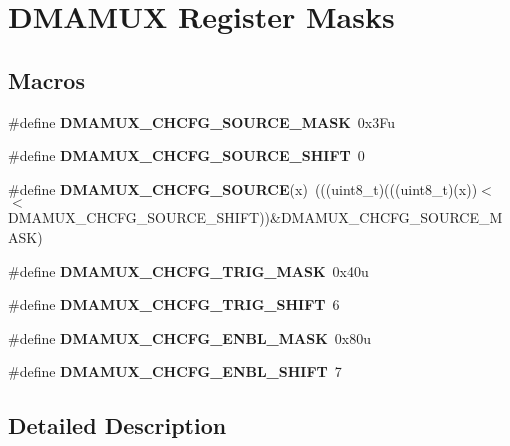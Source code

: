 \hypertarget{group___d_m_a_m_u_x___register___masks}{}\section{D\+M\+A\+M\+UX Register Masks}
\label{group___d_m_a_m_u_x___register___masks}
\subsection*{Macros}
\begin{DoxyCompactItemize}
\item 
\mbox{\label{group___d_m_a_m_u_x___register___masks_ga35b279ba0b1c9e817901494cdac305c5}} 
\#define {\bfseries D\+M\+A\+M\+U\+X\+\_\+\+C\+H\+C\+F\+G\+\_\+\+S\+O\+U\+R\+C\+E\+\_\+\+M\+A\+SK}~0x3\+Fu
\item 
\mbox{\label{group___d_m_a_m_u_x___register___masks_gac2b7553c4599d8e919750598dd03f8a3}} 
\#define {\bfseries D\+M\+A\+M\+U\+X\+\_\+\+C\+H\+C\+F\+G\+\_\+\+S\+O\+U\+R\+C\+E\+\_\+\+S\+H\+I\+FT}~0
\item 
\mbox{\label{group___d_m_a_m_u_x___register___masks_ga26ed125b670223f11ea326335729bb9b}} 
\#define {\bfseries D\+M\+A\+M\+U\+X\+\_\+\+C\+H\+C\+F\+G\+\_\+\+S\+O\+U\+R\+CE}(x)~(((uint8\+\_\+t)(((uint8\+\_\+t)(x))$<$$<$D\+M\+A\+M\+U\+X\+\_\+\+C\+H\+C\+F\+G\+\_\+\+S\+O\+U\+R\+C\+E\+\_\+\+S\+H\+I\+FT))\&D\+M\+A\+M\+U\+X\+\_\+\+C\+H\+C\+F\+G\+\_\+\+S\+O\+U\+R\+C\+E\+\_\+\+M\+A\+SK)
\item 
\mbox{\label{group___d_m_a_m_u_x___register___masks_gafd2b6158f86bedffb640e73c40cdd0f5}} 
\#define {\bfseries D\+M\+A\+M\+U\+X\+\_\+\+C\+H\+C\+F\+G\+\_\+\+T\+R\+I\+G\+\_\+\+M\+A\+SK}~0x40u
\item 
\mbox{\label{group___d_m_a_m_u_x___register___masks_ga714a6b142fde49d701e3f624bb2417e1}} 
\#define {\bfseries D\+M\+A\+M\+U\+X\+\_\+\+C\+H\+C\+F\+G\+\_\+\+T\+R\+I\+G\+\_\+\+S\+H\+I\+FT}~6
\item 
\mbox{\label{group___d_m_a_m_u_x___register___masks_ga311ccb0a9a00f29da44f8c41b33ba79f}} 
\#define {\bfseries D\+M\+A\+M\+U\+X\+\_\+\+C\+H\+C\+F\+G\+\_\+\+E\+N\+B\+L\+\_\+\+M\+A\+SK}~0x80u
\item 
\mbox{\label{group___d_m_a_m_u_x___register___masks_ga23d6f41370761b5c68e4d49f419aaee9}} 
\#define {\bfseries D\+M\+A\+M\+U\+X\+\_\+\+C\+H\+C\+F\+G\+\_\+\+E\+N\+B\+L\+\_\+\+S\+H\+I\+FT}~7
\end{DoxyCompactItemize}


\subsection{Detailed Description}

